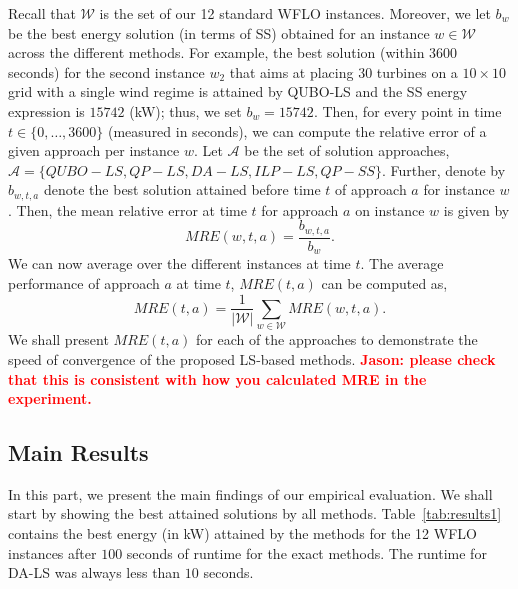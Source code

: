 \documentclass[preprint,12pt]{elsarticle}
\newcommand{\todo}[1]{{\textcolor{red}{\bf {#1}}}}
\begin{document}
Recall that $\mathcal{W}$ is the set of our 12 standard WFLO instances. 
Moreover, we let $b_w$ be the best energy solution (in terms of SS) obtained for an instance $w \in \mathcal{W}$ 
across the different methods. For example, the best solution (within 3600 seconds) for the second instance $w_2$ that aims at placing $30$ turbines on a $10\times10$ grid with a single wind regime is attained by QUBO-LS and the SS energy expression is $15742$ (kW); thus, we set $b_w = 15742$. Then, for every point in time $t \in \{0,\ldots, 3600\}$ (measured in seconds), we can compute the relative error of a given approach per instance $w$. Let $\mathcal{A}$ be the set of solution approaches, $\mathcal{A}= \{QUBO-LS, QP-LS, DA-LS, ILP-LS, QP-SS\}$. Further, denote by $b_{w,t,a}$ denote the best solution attained before time $t$ of approach $a$ for instance $w$. Then, the mean relative error at time $t$ for approach $a$ on instance $w$ is given by \begin{equation}MRE(w,t,a) = \frac{b_{w,t,a}}{b_w}.\end{equation} We can now average over the different instances at time $t$. The average performance of approach $a$ at time $t$, $MRE(t,a)$ can be computed as, \begin{equation} MRE(t,a) = \frac{1}{|\mathcal{W}|}\sum_{ w\in\mathcal{W}} MRE(w,t,a).\end{equation}
We shall present $MRE(t,a)$ for each of the approaches to demonstrate the speed of convergence of the proposed LS-based methods. \todo{Jason: please check that this is consistent with how you calculated MRE in the experiment.} 


\subsection{Main Results}

In this part, we present the main findings of our empirical evaluation. 
We shall start by showing the best attained solutions by all methods.
Table~\ref{tab:results1} contains the best energy (in kW) attained by the methods
for the 12 WFLO instances after $100$ seconds of runtime for the exact methods. 
The runtime for DA-LS was always less than $10$ seconds.
\end{document}
